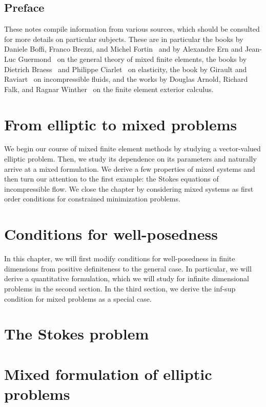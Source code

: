 
\maketitle

\section*{Preface}
%

These notes compile information from various sources, which should be
consulted for more details on particular subjects. These are in
particular the books by Daniele Boffi, Franco Brezzi, and Michel
Fortin~\cite{BoffiBrezziFortin13} and by Alexandre Ern and Jean-Luc
Guermond~\cite{ErnGuermond04} on the general theory of mixed
finite elements, the books by Dietrich Braess~\cite{Braess97,Braess13}
and Philippe Ciarlet~\cite{Ciarlet88} on elasticity, the book by
Girault and Raviart~\cite{GiraultRaviart86} on incompressible fluids,
and the works by Douglas Arnold, Richard Falk, and Ragnar
Winther~\cite{ArnoldFalkWinther06acta,ArnoldFalkWinther10} on the
finite element exterior calculus.

\thispagestyle{empty}
\setcounter{page}{0}


\tableofcontents

\chapter{From elliptic to mixed problems}
We begin our course of mixed finite element methods by studying a
vector-valued elliptic problem. Then, we study its dependence on its
parameters and naturally arrive at a mixed formulation. We derive a
few properties of mixed systems and then turn our attention to the
first example: the Stokes equations of incompressible flow. We close
the chapter by considering mixed systems as first order conditions
for constrained minimization problems.




\chapter{Conditions for well-posedness}
In this chapter, we will first modify conditions for well-posedness in
finite dimensions from positive definiteness to the general case. In
particular, we will derive a quantitative formulation, which we will
study for infinite dimensional problems in the second section. In the
third section, we derive the inf-sup condition for mixed problems as a
special case.
\label{sec:wellposedness}


\chapter{The Stokes problem}


\chapter{Mixed formulation of elliptic problems}


%

\printbibliography
\printindex


